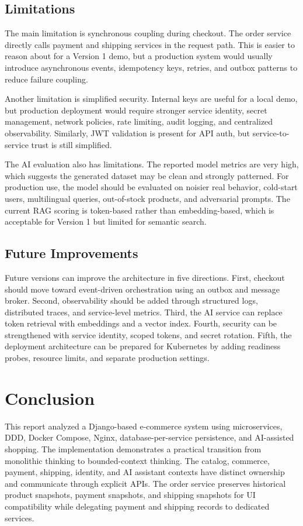 \documentclass[12pt,a4paper]{article}
\begin{document}
\subsection{Limitations}

The main limitation is synchronous coupling during checkout. The order service directly calls payment and shipping services in the request path. This is easier to reason about for a Version 1 demo, but a production system would usually introduce asynchronous events, idempotency keys, retries, and outbox patterns to reduce failure coupling.

Another limitation is simplified security. Internal keys are useful for a local demo, but production deployment would require stronger service identity, secret management, network policies, rate limiting, audit logging, and centralized observability. Similarly, JWT validation is present for API auth, but service-to-service trust is still simplified.

The AI evaluation also has limitations. The reported model metrics are very high, which suggests the generated dataset may be clean and strongly patterned. For production use, the model should be evaluated on noisier real behavior, cold-start users, multilingual queries, out-of-stock products, and adversarial prompts. The current RAG scoring is token-based rather than embedding-based, which is acceptable for Version 1 but limited for semantic search.

\subsection{Future Improvements}

Future versions can improve the architecture in five directions. First, checkout should move toward event-driven orchestration using an outbox and message broker. Second, observability should be added through structured logs, distributed traces, and service-level metrics. Third, the AI service can replace token retrieval with embeddings and a vector index. Fourth, security can be strengthened with service identity, scoped tokens, and secret rotation. Fifth, the deployment architecture can be prepared for Kubernetes by adding readiness probes, resource limits, and separate production settings.

\section{Conclusion}

This report analyzed a Django-based e-commerce system using microservices, DDD, Docker Compose, Nginx, database-per-service persistence, and AI-assisted shopping. The implementation demonstrates a practical transition from monolithic thinking to bounded-context thinking. The catalog, commerce, payment, shipping, identity, and AI assistant contexts have distinct ownership and communicate through explicit APIs. The order service preserves historical product snapshots, payment snapshots, and shipping snapshots for UI compatibility while delegating payment and shipping records to dedicated services.
\end{document}
